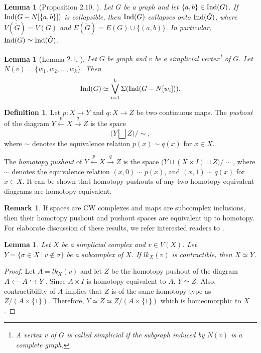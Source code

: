 \documentclass[12pt]{article}
\newtheorem{lem}[thm]{Lemma}
\numberwithin{thm}{section}
\theoremstyle{definition}
\newtheorem{defn}[thm]{Definition}
\newtheorem{rmk}{Remark}
\newcommand{\ind}{{\rm{Ind}}}
\begin{document}
  
  \begin{lem}[Proposition $2.10$, \cite{JS10}]\label{lem:addedge} Let $G$ be  a graph and let $\{a,b\} \in \ind(G)$. If $\ind(G - N[\{a,b\}])$ is collapsible, then 
  	$\ind(G)$ collapses onto $\ind(\tilde{G})$, where $V(\tilde{G}) = V(G)$ and $E(\tilde{G}) = E(G) \cup \{(a,b)\}$. In particular, $\ind(G) \simeq \ind(\tilde{G})$.
  	\end{lem}
 
  \begin{lem}[Lemma $2.1$, \cite{kk}]\label{lem:simplicial}
  	Let $G$ be  graph and $v$ be a simplicial vertex\footnote{A vertex $v$ of $G$ is called {\it simplicial} if the subgraph induced by $N(v)$ is a complete graph.} of $G$. Let $N(v) = \{w_1, w_2, \ldots, w_k\}$. Then 
  	$$
  	\ind(G) \simeq \bigvee\limits_{i= 1}^{k} \Sigma(\ind(G - N[	w_i])).
  	$$
  	\end{lem}
  
 
  \begin{defn}
       Let $p: X \to Y$ and $q: X \to Z$ be two continuous maps. The  {\it pushout} of the diagram $Y \xleftarrow{p}  X \xrightarrow{q} Z$ is the space 
       $$\Big(Y \bigsqcup   Z \Big)/ \sim,$$ where $\sim$ denotes  the equivalence relation $p(x) \sim q(x)$ for $x \in X$.

   The {\it homotopy  pushout} of  $Y \xleftarrow{p}  X \xrightarrow{q} Z$ 
  is the space $\big(Y \sqcup ( X \times I ) \sqcup  Z\big)/ \sim$, where 
  $\sim$ denotes  the equivalence relation $(x,0) \sim p(x)$, and $(x,1) \sim q(x)$ for $x \in X$. It can be shown that homotopy pushouts of any two homotopy equivalent diagrams are homotopy equivalent.

  \end{defn}
  
  \begin{rmk}\label{rmk:homotopypushout}
      If spaces are CW complexes and maps are subcomplex  inclusions, then their homotopy pushout and pushout spaces are equivalent up to homotopy. For elaborate discussion of these results, we refer interested readers to \cite[Chapter 7]{bredon}.
  \end{rmk}
  
  
  \begin{lem} \label{lem:link} Let $X$ be  a simplicial complex and $v\in V(X)$. Let $Y = \{\sigma \in X \ | \ v \notin \sigma \}$ be  a subcomplex of $X$. If  $lk_X(v)$ is contractible, then $X \simeq Y$. 
\end{lem}
\begin{proof}
Let $A= lk_X(v)$ and let $Z$ be the homotopy pushout of the diagram $A \xleftarrow{=}  A \xhookrightarrow{} Y$.  Since $A \times I$ is homotopy equivalent to $A$, $Y \simeq Z$. Also, contractibility of $A$ implies that $Z$ is of the same homotopy type as $Z/ (A \times \{1\})$. Therefore,  
	$	Y \simeq Z \simeq Z / (A \times \{1\})$ which is homeomorphic to $X$.
\end{proof}
\end{document}
